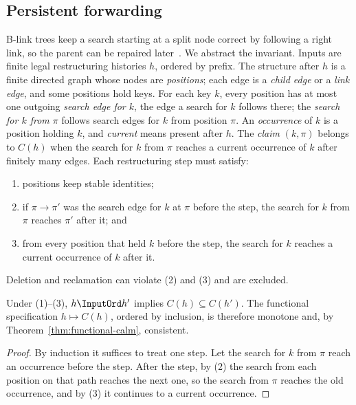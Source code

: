 \subsection{Persistent forwarding}

B-link trees keep a search starting at a split node correct by following a
right link, so the parent can be repaired later~\cite{lehman1981efficient}.  We
abstract the invariant.  Inputs are finite legal restructuring histories $h$,
ordered by prefix.  The structure after $h$ is a finite directed graph whose
nodes are \emph{positions}; each edge is a \emph{child edge} or a \emph{link
edge}, and some positions hold keys.  For each key $k$, every position has at
most one outgoing \emph{search edge for $k$}, the edge a search for $k$
follows there; the \emph{search for $k$ from $\pi$} follows search edges for
$k$ from position $\pi$.  An \emph{occurrence} of $k$ is a position holding
$k$, and \emph{current} means present after $h$.  The \emph{claim} $(k,\pi)$
belongs to $C(h)$ when the search for $k$ from $\pi$ reaches a current
occurrence of $k$ after finitely many edges.  Each restructuring step must
satisfy:
\begin{enumerate}
  \item positions keep stable identities;
  \item if $\pi\to\pi'$ was the search edge for $k$ at $\pi$ before the step,
        the search for $k$ from $\pi$ reaches $\pi'$ after it; and
  \item from every position that held $k$ before the step, the search for $k$
        reaches a current occurrence of $k$ after it.
\end{enumerate}
Deletion and reclamation can violate (2) and (3) and are excluded.

\begin{proposition}
\label{prop:persistent-forwarding}
Under (1)--(3), $h\InputOrd h'$ implies $C(h)\subseteq C(h')$.  The functional
specification $h\mapsto C(h)$, ordered by inclusion, is therefore monotone and,
by Theorem~\ref{thm:functional-calm}, consistent.
\end{proposition}

\begin{proof}
By induction it suffices to treat one step.  Let the search for $k$ from $\pi$
reach an occurrence before the step.  After the step, by (2) the search from
each position on that path reaches the next one, so the search from $\pi$
reaches the old occurrence, and by (3) it continues to a current occurrence.
\end{proof}

